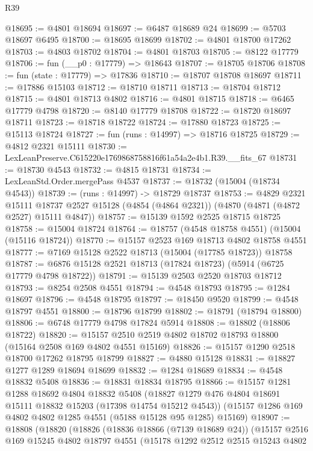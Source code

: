 \begin{lexlean}{R39}
\begin{coremodule}
@18695 := @4801 @18694
@18697 := @6487 @18689 @24
@18699 := @5703 @18697 @6495
@18700 := @18695 @18699
@18702 := @4801 @18700 @17262
@18703 := @4803 @18702
@18704 := @4801 @18703
@18705 := @8122 @17779
@18706 := fun (__p0 : @17779) => @18643
@18707 := @18705 @18706
@18708 := fun (state : @17779) => @17836
@18710 := @18707 @18708 @18697
@18711 := @17886 @15103
@18712 := @18710 @18711
@18713 := @18704 @18712
@18715 := @4801 @18713 @4802
@18716 := @4801 @18715
@18718 := @6465 @17779 @4798
@18720 := @8140 @17779 @18708
@18722 := @18720 @18697 @18711
@18723 := @18718 @18722
@18724 := @17880 @18723
@18725 := @15113 @18724
@18727 := fun (runs : @14997) => @18716 @18725
@18729 := @4812 @2321 @15111
@18730 := LexLeanPreserve.C615220e1769868758816f61a54a2e4b1.R39.__fits_67
@18731 := @18730 @4543
@18732 := @4815 @18731
@18734 := LexLeanStd.Order.mergePass @4537
@18737 := @18732 (@15004 (@18734 @4543))
@18739 := (runs : @14997) -> @18729 @18737
@18753 := @4829
    @2321
    @15111
    @18737
    @2527
    @15128
    (@4854 (@4864 @2321))
    (@4870 (@4871 (@4872 @2527) @15111 @4847))
@18757 := @15139 @1592 @2525 @18715 @18725
@18758 := @15004 @18724
@18764 := @18757 (@4548 @18758 @4551) (@15004 (@15116 @18724))
@18770 := @15157 @2523 @169 @18713 @4802 @18758 @4551
@18777 := @7169 @15128 @2522 @18713 (@15004 (@17785 @18723)) @18758
@18787 := @6876 @15128 @2521 @18713 (@17824 @18723) (@5914 (@6725 @17779 @4798 @18722))
@18791 := @15139 @2503 @2520 @18703 @18712
@18793 := @8254 @2508 @4551
@18794 := @4548 @18793
@18795 := @1284 @18697
@18796 := @4548 @18795
@18797 := @18450 @9520
@18799 := @4548 @18797 @4551
@18800 := @18796 @18799
@18802 := @18791 (@18794 @18800)
@18806 := @6748 @17779 @4798 @17824 @5914
@18808 := @18802 (@18806 @18722)
@18820 := @15157 @2510 @2519 @4802 @18702 @18793 @18800 (@15164 @2508 @169 @4802 @4551 @15169)
@18826 := @15157 @1290 @2518 @18700 @17262 @18795 @18799
@18827 := @4880 @15128
@18831 := @18827 @1277 @1289 @18694 @18699
@18832 := @1284 @18689
@18834 := @4548 @18832 @5408
@18836 := @18831 @18834 @18795
@18866 := @15157
    @1281
    @1288
    @18692
    @4804
    @18832
    @5408
    (@18827 @1279 @476 @4804 @18691 @15111 @18832 @15203 (@17398 @14754 @15212 @4543))
    (@15157 @1286 @169 @4802 @4802 @1285 @4551 (@5188 @15128 @95 @1285) @15169)
@18907 := @18808
    (@18820
      (@18826
        (@18836 @18866 (@7139 @18689 @24))
        (@15157
          @2516
          @169
          @15245
          @4802
          @18797
          @4551
          (@15178
            @1292
            @2512
            @2515
            @15243
            @4802

\end{coremodule}
\end{lexlean}
